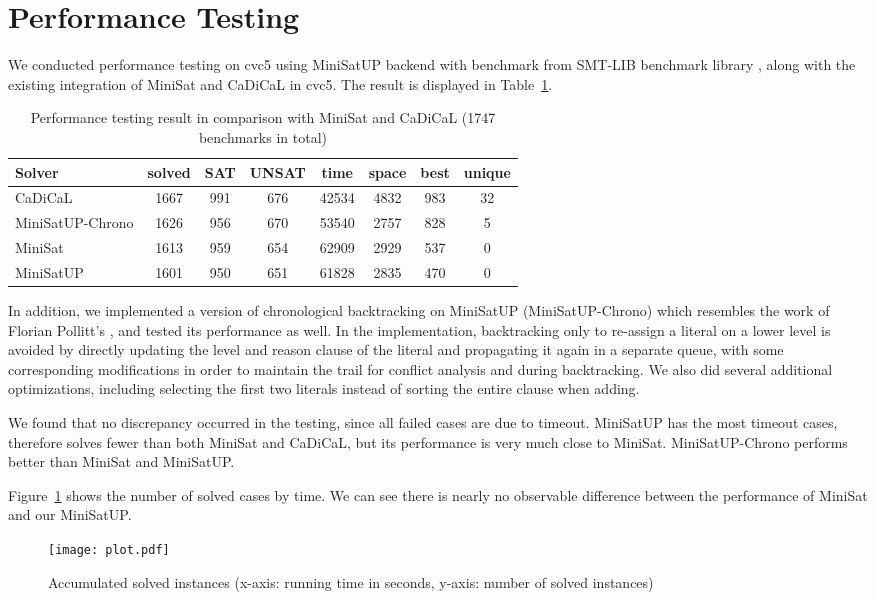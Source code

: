 \section{Performance Testing}

We conducted performance testing on cvc5 using MiniSatUP backend with benchmark  from SMT-LIB benchmark library \cite{https://doi.org/10.5281/zenodo.16740866}, along with the existing integration of MiniSat and CaDiCaL in cvc5. The result is displayed in Table~\ref{tab:perf}.

\begin{table}[!htbp]
  \centering
  \begin{tabular}{lccccccc}
    \hline
    Solver & solved & SAT & UNSAT & time & space & best & unique \\
    \hline
    CaDiCaL          & 1667 & 991 & 676 & 42534 & 4832 & 983 & 32 \\
    MiniSatUP-Chrono & 1626 & 956 & 670 & 53540 & 2757 & 828 & 5 \\
    MiniSat          & 1613 & 959 & 654 & 62909 & 2929 & 537 & 0 \\
    MiniSatUP        & 1601 & 950 & 651 & 61828 & 2835 & 470 & 0 \\
    \hline
  \end{tabular}
  \caption[Performance testing result]{Performance testing result in comparison with MiniSat and CaDiCaL (1747 benchmarks in total)}
  \label{tab:perf}
\end{table}

In addition, we implemented a version of chronological backtracking on MiniSatUP (MiniSatUP-Chrono) which resembles the work of Florian Pollitt's \cite{Florian24}, and tested its performance as well. In the implementation, backtracking only to re-assign a literal on a lower level is avoided by directly updating the level and reason clause of the literal and propagating it again in a separate queue, with some corresponding modifications in order to maintain the trail for conflict analysis and during backtracking. We also did several additional optimizations, including selecting the first two literals instead of sorting the entire clause when adding.

We found that no discrepancy occurred in the testing, since all failed cases are due to timeout. MiniSatUP has the most timeout cases, therefore solves fewer than both MiniSat and CaDiCaL, but its performance is very much close to MiniSat. MiniSatUP-Chrono performs better than MiniSat and MiniSatUP.

Figure~\ref{fig:cdf} shows the number of solved cases by time. We can see there is nearly no observable difference between the performance of MiniSat and our MiniSatUP.

\begin{figure}[h]
  \centering
  \texttt{[image: plot.pdf]}
  \caption[Accumulated solved instances]{Accumulated solved instances (x-axis: running time in seconds, y-axis: number of solved instances)}
  \label{fig:cdf}
\end{figure}
